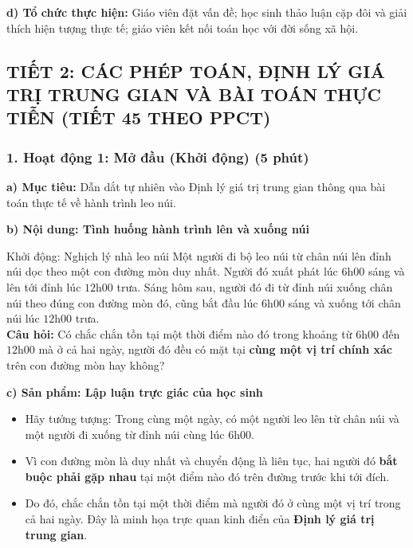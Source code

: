\documentclass[12pt, a4paper]{article}
\begin{document}
\noindent \textbf{d) Tổ chức thực hiện:}
Giáo viên đặt vấn đề; học sinh thảo luận cặp đôi và giải thích hiện tượng thực tế; giáo viên kết nối toán học với đời sống xã hội.

\newpage

\subsection*{TIẾT 2: CÁC PHÉP TOÁN, ĐỊNH LÝ GIÁ TRỊ TRUNG GIAN VÀ BÀI TOÁN THỰC TIỄN (TIẾT 45 THEO PPCT)}

\subsubsection*{1. Hoạt động 1: Mở đầu (Khởi động) (5 phút)}

\noindent \textbf{a) Mục tiêu:}
Dẫn dắt tự nhiên vào Định lý giá trị trung gian thông qua bài toán thực tế về hành trình leo núi.

\noindent \textbf{b) Nội dung: Tình huống hành trình lên và xuống núi}
\begin{pedabox}{Khởi động: Nghịch lý nhà leo núi}
Một người đi bộ leo núi từ chân núi lên đỉnh núi dọc theo một con đường mòn duy nhất. Người đó xuất phát lúc $6\text{h}00$ sáng và lên tới đỉnh lúc $12\text{h}00$ trưa. Sáng hôm sau, người đó đi từ đỉnh núi xuống chân núi theo đúng con đường mòn đó, cũng bắt đầu lúc $6\text{h}00$ sáng và xuống tới chân núi lúc $12\text{h}00$ trưa.\\
\textbf{Câu hỏi:} Có chắc chắn tồn tại một thời điểm nào đó trong khoảng từ $6\text{h}00$ đến $12\text{h}00$ mà ở cả hai ngày, người đó đều có mặt tại \textbf{cùng một vị trí chính xác} trên con đường mòn hay không?
\end{pedabox}

\noindent \textbf{c) Sản phẩm: Lập luận trực giác của học sinh}
\begin{itemize}[leftmargin=0.6cm]
    \item Hãy tưởng tượng: Trong cùng một ngày, có một người leo lên từ chân núi và một người đi xuống từ đỉnh núi cùng lúc $6\text{h}00$.
    \item Vì con đường mòn là duy nhất và chuyển động là liên tục, hai người đó \textbf{bắt buộc phải gặp nhau} tại một điểm nào đó trên đường trước khi tới đích.
    \item Do đó, chắc chắn tồn tại một thời điểm mà người đó ở cùng một vị trí trong cả hai ngày. Đây là minh họa trực quan kinh điển của \textbf{Định lý giá trị trung gian}.
\end{itemize}
\end{document}
